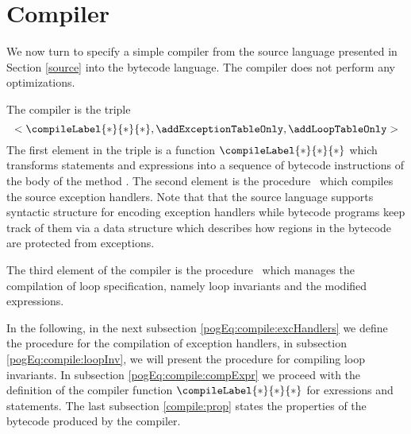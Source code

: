 

\newtheorem{Compiler}{Definition}

\section{Compiler} \label{compile}

We now turn to specify a simple compiler from the source language presented in Section
\ref{source} into the bytecode language. The compiler does not perform any optimizations. 

The compiler is the triple
 $$< \compileLabel{*}{*}{*}, \addExceptionTableOnly , \addLoopTableOnly >$$
 The first element in the triple is a  function $\compileLabel{*}{*}{*}$ which transforms statements and expressions
 into a sequence of bytecode instructions of the body of the method \methodd. 
The second element is the procedure  \addExceptionTableOnly \ which compiles  the source exception handlers.
Note that that the source language supports syntactic structure for encoding exception handlers while
 bytecode programs keep track of them via a data structure which describes how  regions 
in the bytecode are protected from exceptions.

 The third element of the compiler is the procedure
  \addLoopTableOnly \ which manages the compilation of loop
specification, namely loop invariants and the modified expressions. 

In the following, in the next subsection \ref{pogEq:compile:excHandlers} we define the procedure for the compilation of exception handlers,
 in subsection \ref{pogEq:compile:loopInv},  we will present the procedure for compiling loop invariants.
 In  subsection
\ref{pogEq:compile:compExpr} 
we proceed with the definition of the compiler function $\compileLabel{*}{*}{*} $ for exressions and statements. 
The last subsection \ref{compile:prop} states the properties of the bytecode produced by the compiler.




%




